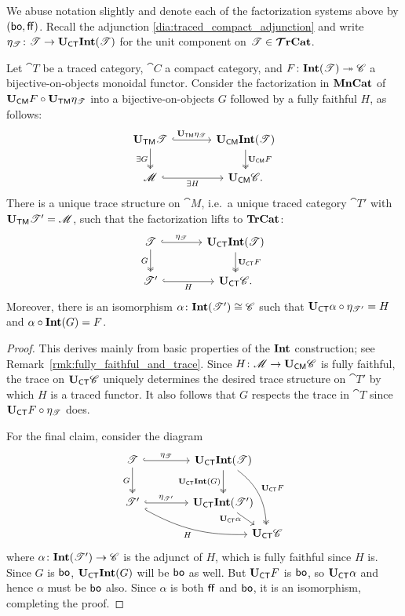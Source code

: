 \documentclass[11pt,oneside,article]{memoir}
\begin{document}
We abuse notation slightly and denote each of the factorization systems above by $(\mathsf{bo},\mathsf{ff})$. Recall
the adjunction \eqref{dia:traced_compact_adjunction} and write
$\eta_{\mathscr{T}}\colon\mathscr{T}\to\mathbf{U}_{\mathsf{CT}}\mathbf{Int}(\mathscr{T})$ for the unit component on $\mathscr{T}\in\bm{\mathcal{T}}\mathbf{rCat}$.

\begin{lemma}
    \label{lem:Tr_bo_Int}
  Let $\cat{T}$ be a traced category, $\cat{C}$ a compact category, and
  $F\colon\mathbf{Int}(\mathscr{T})\twoheadrightarrow \mathscr{C}$ a bijective-on-objects monoidal functor. Consider
  the factorization in $\mathbf{MnCat}$ of $\mathbf{U}_{\mathsf{CM}} F\circ\mathbf{U}_{\mathsf{TM}}\eta_{\mathscr{T}}$ into a bijective-on-objects $G$
  followed by a fully faithful $H$, as follows:
  \[ \begin{tikzcd}[column sep=large]
    \UTM \cat{T} \ar[r,hook,"\UTM\eta_{\cat{T}}"] \ar[d,two heads,"\exists G"']
      & \UCM\Int(\cat{T}) \ar[d,two heads,"\UCM F"] \\
    \cat{M} \ar[r,hook,"\exists H"'] & \UCM \cat{C}.
  \end{tikzcd} \]
  There is a unique trace structure on $\cat{M}$, i.e.\ a unique traced category $\cat{T}'$ with
  $\mathbf{U}_{\mathsf{TM}} \mathscr{T}'=\mathscr{M}$, such that the factorization lifts to $\mathbf{TrCat}$:
  \[ \begin{tikzcd}[column sep=large]
    \cat{T} \ar[r,hook,"\eta_{\cat{T}}"] \ar[d,two heads,"G"']
      & \UCT\Int(\cat{T}) \ar[d,two heads,"\UCT F"] \\
    \cat{T}' \ar[r,hook,"H"'] & \UCT \cat{C}.
  \end{tikzcd} \]
  Moreover, there is an isomorphism $\alpha\colon\mathbf{Int}(\mathscr{T}')\cong \mathscr{C}$ such that
  $\mathbf{U}_{\mathsf{CT}}\alpha\circ \eta_{\mathscr{T}'}=H$ and $\alpha\circ\mathbf{Int}(G)=F$.
\end{lemma}
\begin{proof}
  This derives mainly from basic properties of the $\mathbf{Int}$ construction; see
  Remark~\ref{rmk:fully_faithful_and_trace}. Since $H\colon\mathscr{M}\to\mathbf{U}_{\mathsf{CM}}\mathscr{C}$ is fully faithful,
  the trace on $\mathbf{U}_{\mathsf{CT}}\mathscr{C}$ uniquely determines the desired trace structure on $\cat{T}'$ by which
  $H$ is a traced functor. It also follows that $G$ respects the trace in $\cat{T}$ since $\mathbf{U}_{\mathsf{CT}}
  F\circ\eta_{\mathscr{T}}$ does. 

  For the final claim, consider the diagram
  \[ \begin{tikzcd}[column sep=4em, row sep=5ex]
    \cat{T} \ar[r,hook,"\eta_{\cat{T}}"] \ar[d,two heads,"G"']
      & \UCT\Int(\cat{T}) \ar[d,two heads,"\UCT\Int(G)"']
        \ar[ddr,two heads,bend left=25,"\UCT F"] &[between origins] \\
    \cat{T}' \ar[r,hook,"\eta_{\cat{T}'}"] \ar[drr,hook,bend right=15,"H"']
      & \UCT\Int(\cat{T}') \ar[dr,"\UCT\alpha"' {inner sep=0pt,pos=.25}] & \\[-10]
      &&\UCT \cat{C}
  \end{tikzcd} \]
  where $\alpha\colon\mathbf{Int}(\mathscr{T}')\to \mathscr{C}$ is the adjunct of $H$, which is fully faithful since
  $H$ is. Since $G$ is $\mathsf{bo}$, $\mathbf{U}_{\mathsf{CT}}\mathbf{Int}(G)$ will be $\mathsf{bo}$ as well. But $\mathbf{U}_{\mathsf{CT}} F$ is $\mathsf{bo}$, so $\mathbf{U}_{\mathsf{CT}}
  \alpha$ and hence $\alpha$ must be $\mathsf{bo}$ also. Since $\alpha$ is both $\mathsf{ff}$ and $\mathsf{bo}$, it is an
  isomorphism, completing the proof.
\end{proof}
\end{document}
